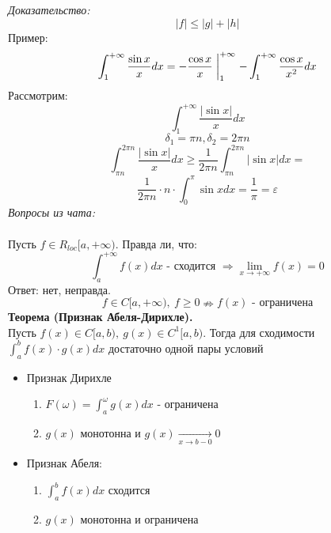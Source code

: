 \documentclass{article}
\newcommand*{\theorem}[2]{\textbf{Теорема #1. } #2 \newline}
\begin{document}
\textit{Доказательство: \\}
$$
    |f| \leq |g| + |h|
$$
Пример: 
$$
    \int_{1}^{+\infty}\frac{\sin x}{x}dx = -\frac{\cos x}{x}\biggm\vert_{1}^{+\infty} - \int_{1}^{+\infty} \frac{\cos x}{x^2} dx
$$
Рассмотрим: 
$$ 
    \int_{1}^{+\infty} \frac{|\sin x|}{x}dx
$$
$$
    \delta_1 = \pi n, \delta_2 = 2\pi n
$$
$$
    \int_{\pi n}^{2 \pi n} \frac{|\sin x|}{x}dx \geq \frac{1}{2 \pi n} \int_{\pi n}^{2 \pi n}|\sin x|dx =
$$
$$
    \frac{1}{2 \pi n} \cdot n \cdot \int_{0}^{\pi} \sin x dx = \frac{1}{\pi} = \varepsilon
$$
\Large{\textit{Вопросы из чата:\\\\}}
Пусть $f \in R_{loc}[a, +\infty)$. Правда ли, что: 
$$
    \int_{a}^{+\infty}f(x)dx \text{ - сходится }\Rightarrow \displaystyle \lim_{x \to +\infty}f(x) = 0
$$
Ответ: нет, неправда.
$$
    f \in C[a, +\infty),\ f \geq 0 \nRightarrow f(x) \text{ - ограничена}
$$
\theorem{(Признак Абеля-Дирихле)}{}\\
Пусть $f(x) \in C[a, b),\ g(x) \in C^1[a, b)$. 
Тогда для сходимости $\int_{a}^{b} f(x) \cdot g(x) dx$ достаточно одной пары условий
\begin{itemize}
    \item {
        Признак Дирихле
        \begin{enumerate}
            \item $F(\omega) = \int_{a}^{\omega}g(x)dx \text{ - ограничена}$
            \item $g(x) \text{ монотонна и }g(x) \xrightarrow[x \to b - 0]{}0$
        \end{enumerate}
    }
    \item {
        Признак Абеля: 
        \begin{enumerate}
            \item $\int_{a}^{b} f(x)dx \text{ сходится }$
            \item $g(x) \text { монотонна и ограничена}$
        \end{enumerate}
    }
\end{itemize}
\end{document}
